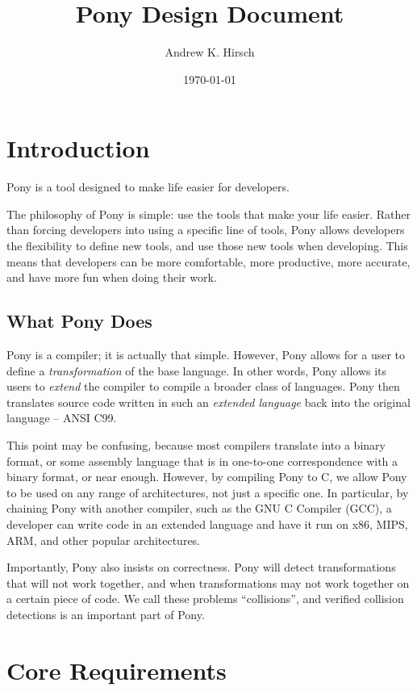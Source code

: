 \documentclass[11pt]{article}
\title{Pony Design Document}
\author{Andrew K. Hirsch}
\date{\today}
\begin{document}
\maketitle


\section{Introduction}
\label{sec-1}


Pony is a tool designed to make life easier for developers. 

The philosophy of Pony is simple: use the tools that make your life easier. Rather than forcing developers into using a specific line of tools, Pony allows developers the flexibility to define new tools, and use those new tools when developing. This means that developers can be more comfortable, more productive, more accurate, and have more fun when doing their work.
\subsection{What Pony Does}
\label{sec-1-1}


Pony is a compiler; it is actually that simple. However, Pony allows for a user to define a \emph{transformation} of the base language. In other words, Pony allows its users to \emph{extend} the compiler to compile a broader class of languages. Pony then translates source code written in such an \emph{extended language} back into the original language -- ANSI C99. 

This point may be confusing, because most compilers translate into a binary format, or some assembly language that is in one-to-one correspondence with a binary format, or near enough. However, by compiling Pony to C, we allow Pony to be used on any range of architectures, not just a specific one. In particular, by chaining Pony with another compiler, such as the GNU C Compiler (GCC), a developer can write code in an extended language and have it run on x86, MIPS, ARM, and other popular architectures.

Importantly, Pony also insists on correctness. Pony will detect transformations that will not work together, and when transformations may not work together on a certain piece of code. We call these problems ``collisions'', and verified collision detections is an important part of Pony.
\section{Core Requirements}
\label{sec-2}
\end{document}
